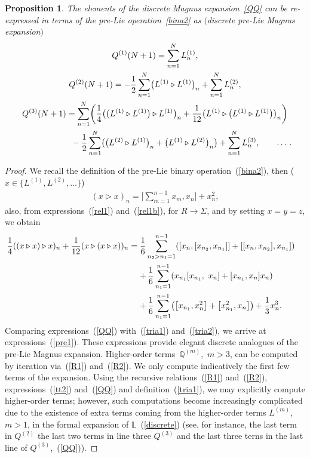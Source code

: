 \documentclass[10pt,a4paper]{amsart}
\numberwithin{equation}{section}
\newtheorem{pro}[thm]{Proposition}
\theoremstyle{definition}
\def\mathcal#1{#1}%
\begin{document}
\begin{pro} \label{prom}
The elements of the discrete Magnus expansion~\eqref{QQ} can be re-expressed in terms of the pre-Lie operation~\eqref{bina2} as $(${\it discrete pre-Lie Magnus expansion}$)$
\begin{gather}
 {\mathcal Q}^{(1)}(N+1) = \sum_{n=1}^NL^{(1)}_n, \nonumber\\
 {\mathcal Q}^{(2)}(N+1) =-\frac{1}{2} \sum_{n=1}^N
 \bigl(L^{(1)} \triangleright L^{(1)}\bigr)_n +\sum_{n=1}^NL_n^{(2)},\nonumber\\
 {\mathcal Q}^{(3)}(N+1)= \sum_{n=1}^N\biggl(
\frac{1}{4} \bigl(\bigl(L^{(1)} \triangleright L^{(1)}\bigr) \triangleright L^{(1)}\bigr)_n +\frac{1}{12}
\bigl(L^{(1)} \triangleright \bigl(L^{(1)} \triangleright L^{(1)}\bigr)\bigr)_n \biggr)\nonumber\\
\hphantom{ {\mathcal Q}^{(3)}(N+1)=}{}
-\frac{1}{2} \sum_{n=1}^N\bigl(\bigl(L^{(2)} \triangleright L^{(1)}\bigr)_n+ \bigl(L^{(1)}\triangleright L^{(2)}\bigr)_n\bigr)
+ \sum_{n=1}^N L_n^{(3)},\qquad \dots\,. \label{pre1}
\end{gather}
\end{pro}

\begin{proof}
We recall the definition of the pre-Lie binary operation~(\ref{bina2}), then \big($x \in\bigl\{ L^{(1)}, L^{(2)}, \dots\bigr\}$\big)
\begin{gather}
(x \triangleright x) _n= \Biggl[\sum_{m=1}^{n-1}x_m, x_n \Biggr] +
x_n^2, \label{tria1}
\end{gather}
also, from expressions~(\ref{rel1}) and~(\ref{rel1b}), for $R \to \Sigma$, and by setting $x=y=z$, we obtain
\begin{align}
\frac{1}{4}((x \triangleright x) \triangleright x)_n +
\frac{1}{12} (x \triangleright (x \triangleright x))_n ={}& \frac{1}{6} \sum_{n_2>n_1=1}^{n-1}
 ([x_{n}, [x_{n_2}, x_{n_1} ] ] +
[[x_{n}, x_{n_2} ], x_{n_1} ]) \cr
&{+}\, \frac{1}{6} \sum_{n_1=1}^{n-1} ( x_{n_1}[x_{n_1},\
x_{n}] + [x_{n_1}, x_{n}] x_{n} ) \cr
&{+}\, \frac{1}{6} \sum_{n_1=1}^{n-1} \bigl(\bigl[x_{n_1}, x^2_{n}\bigr] +
\bigl[x^2_{n_1}, x_{n}\bigr] \bigr) +
\frac{1}{3} x^3_{n}. \label{tria2}
\end{align}
Comparing expressions~(\ref{QQ}) with~(\ref{tria1}) and~(\ref{tria2}), we arrive at expressions~(\ref{pre1}).
These expressions provide elegant discrete analogues of the pre-Lie Magnus expansion. Higher-order terms~${\mathbb Q}^{(m)}$,~${m>3}$, can be computed by iteration via~(\ref{R1}) and~(\ref{R2}).
We only compute indicatively the first few terms of the expansion. Using the recursive relations~(\ref{R1}) and~(\ref{R2}),
expressions~(\ref{tt2}) and~(\ref{QQ}) and definition~(\ref{tria1}), we may explicitly compute higher-order terms; however, such
computations become increasingly complicated due to the existence of extra terms coming from the higher-order terms $L^{(m)}$, $m>1$,
in the formal expansion of ${\mathbb L}$~(\ref{discrete}) (see, for instance, the last term in ${\mathcal Q}^{(2)}$ the last two terms in line three ${\mathcal Q}^{(3)}$ and the last three terns in the last line of
${\mathcal Q}^{(3)}$,~(\ref{QQ})).
\end{proof}
\end{document}
